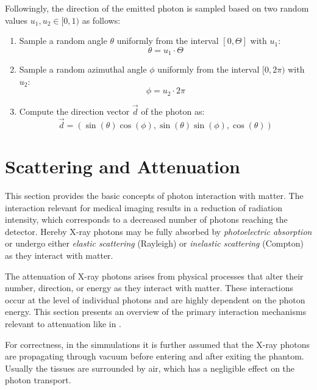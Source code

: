 Followingly, the direction of the emitted photon is sampled based on two random
values $u_1, u_2 \in [0,1)$ as follows:
\begin{enumerate}
    \item Sample a random angle $\theta$ uniformly from the interval $[0,
    \Theta]$ with $u_1$:
    $$\theta = u_1 \cdot \Theta$$
    \item Sample a random azimuthal angle $\phi$ uniformly from the interval
    $[0, 2\pi)$ with $u_2$:
    $$\phi = u_2 \cdot 2\pi$$
    \item Compute the direction vector $\vec{d}$ of the photon as:
    $$\vec{d} = (\sin(\theta) \cos(\phi), \sin(\theta) \sin(\phi),
    \cos(\theta))$$
\end{enumerate}


\section{Scattering and Attenuation}

This section provides the basic concepts of photon interaction with matter. The
interaction relevant for medical imaging results in a reduction of radiation
intensity, which corresponds to a decreased number of photons reaching the
detector. Hereby X-ray photons may be fully absorbed by \emph{photoelectric absorption} or undergo either \emph{elastic scattering} (Rayleigh) or \emph{inelastic scattering} (Compton) as they interact with matter.

The attenuation of X-ray photons arises from physical processes that alter their
number, direction, or energy as they interact with matter. These interactions
occur at the level of individual photons and are highly dependent on the photon
energy. This section presents an overview of the primary interaction mechanisms
relevant to attenuation like in \cite{medicalImagingSystemsIntro2019:}.

For correctness, in the simmulations it is further assumed that the X-ray
photons are propagating through vacuum before entering and after exiting the
phantom. Usually the tissues are surrounded by air, which has a negligible
effect on the photon transport.

